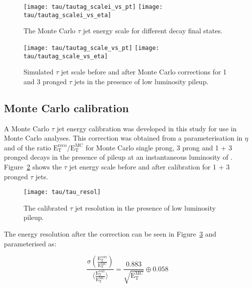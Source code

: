 \begin{figure}[tb]
  \centering
  \texttt{[image: tau/tautag\_scalei\_vs\_pt]}
  \texttt{[image: tau/tautag\_scalei\_vs\_eta]}
  \caption{The Monte Carlo $\tau$ jet energy scale for different decay final states.~\cite{CMS_TDR_PHYS_vol1, citeulike:800614} 
  \label{fig:tau_scale}}
\end{figure}

\begin{figure}[!hHtb]
  \centering
  \texttt{[image: tau/tautag\_scale\_vs\_pt]}
  \texttt{[image: tau/tautag\_scale\_vs\_eta]}
  \caption{Simulated $\tau$ jet \ET scale before and after Monte Carlo corrections for 1 and 3 pronged $\tau$ jets in the presence of low luminosity pileup.~\cite{CMS_TDR_PHYS_vol1, citeulike:800614}
  \label{fig:tau_scale_corr}}
\end{figure}

\subsection{Monte Carlo calibration~\label{sec:MC_tau_calib}}


A Monte Carlo $\tau$ jet energy calibration was developed in this study for use in Monte Carlo analyses. This correction was obtained from a parameterisation in $\eta$ and \ET of the ratio $\mathrm{E_{T}^{reco}/E_{T}^{MC}}$ for  Monte Carlo single prong, 3 prong and 1 + 3 pronged decays in the presence of pileup at an instantaneous luminosity of \lowlumi. Figure~\ref{fig:tau_scale_corr} shows the $\tau$ jet energy scale before and after calibration for 1 + 3 pronged $\tau$ jets.



\begin{figure}[tb]
  \centering
  \texttt{[image: tau/tau\_resol]}
  \caption{The calibrated $\tau$ jet \ET resolution in the presence of low luminosity pileup.~\cite{CMS_TDR_PHYS_vol1, citeulike:800614}
  \label{fig:tau_resol}}
\end{figure}

The energy resolution after the correction can be seen in Figure~\ref{fig:tau_resol} and parameterised as:

\begin{equation}
\mathrm{
\frac{\sigma\left(\frac{E_{T}^{corr}}{E_{T}^{MC}}\right)}{\langle\frac{E_{
	      T}^{corr}}{E_{T}^{MC}}\rangle}=\frac{0.883}{\sqrt{E_{T}^{MC}}} \oplus 0.058
}
\end{equation}

